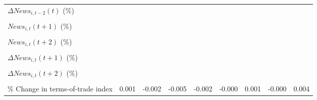 {\begin{tabular}{l*{8}{c}}
\addlinespace
$ \Delta News_{i,t-2}(t)$ (\%)&                     &                     &                     &                     &                     &                     &                     &                     \\
                    &                     &                     &                     &                     &                     &                     &                     &                     \\
\addlinespace
$ News_{i,t}(t+1)$ (\%)&                     &                     &                     &                     &                     &                     &                     &                     \\
                    &                     &                     &                     &                     &                     &                     &                     &                     \\
\addlinespace
$ News_{i,t}(t+2)$ (\%)&                     &                     &                     &                     &                     &                     &                     &                     \\
                    &                     &                     &                     &                     &                     &                     &                     &                     \\
\addlinespace
$ \Delta News_{i,t}(t+1)$ (\%)&                     &                     &                     &                     &                     &                     &                     &                     \\
                    &                     &                     &                     &                     &                     &                     &                     &                     \\
\addlinespace
$ \Delta News_{i,t}(t+2)$ (\%)&                     &                     &                     &                     &                     &                     &                     &                     \\
                    &                     &                     &                     &                     &                     &                     &                     &                     \\
\addlinespace
\% Change in terms-of-trade index&       0.001         &      -0.002         &      -0.005         &      -0.002         &      -0.000         &       0.001         &      -0.000         &       0.004         \\

\end{tabular}}
